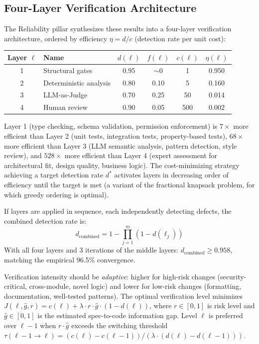 \documentclass[11pt, a4paper, logo, copyright]{googledeepmind}
\begin{document}
\subsection{Four-Layer Verification Architecture}

The Reliability pillar synthesizes these results into a four-layer verification architecture, ordered by efficiency $\eta = d/c$ (detection rate per unit cost):

\begin{center}
\small
\begin{tabular}{clcccc}
\toprule
Layer $\ell$ & Name & $d(\ell)$ & $f(\ell)$ & $c(\ell)$ & $\eta(\ell)$ \\
\midrule
1 & Structural gates & 0.95 & ${\sim}0$ & 1 & 0.950 \\
2 & Deterministic analysis & 0.80 & 0.10 & 5 & 0.160 \\
3 & LLM-as-Judge & 0.70 & 0.25 & 50 & 0.014 \\
4 & Human review & 0.90 & 0.05 & 500 & 0.002 \\
\bottomrule
\end{tabular}
\end{center}

Layer 1 (type checking, schema validation, permission enforcement) is $7\times$ more efficient than Layer 2 (unit tests, integration tests, property-based tests), $68\times$ more efficient than Layer 3 (LLM semantic analysis, pattern detection, style review), and $528\times$ more efficient than Layer 4 (expert assessment for architectural fit, design quality, business logic). The cost-minimizing strategy achieving a target detection rate $d^*$ activates layers in decreasing order of efficiency until the target is met (a variant of the fractional knapsack problem, for which greedy ordering is optimal).

If layers are applied in sequence, each independently detecting defects, the combined detection rate is:
\begin{equation}
    d_{\text{combined}} = 1 - \prod_{j=1}^{m} (1 - d(\ell_j))
\end{equation}
With all four layers and 3 iterations of the middle layers: $d_{\text{combined}} \geq 0.958$, matching the empirical 96.5\% convergence.

Verification intensity should be \emph{adaptive}: higher for high-risk changes (security-critical, cross-module, novel logic) and lower for low-risk changes (formatting, documentation, well-tested patterns). The optimal verification level minimizes $J(\ell, \hat{g}, r) = c(\ell) + \lambda \cdot r \cdot \hat{g} \cdot (1 - d(\ell))$, where $r \in [0,1]$ is risk level and $\hat{g} \in [0,1]$ is the estimated spec-to-code information gap. Level $\ell$ is preferred over $\ell - 1$ when $r \cdot \hat{g}$ exceeds the switching threshold $\tau(\ell{-}1 \to \ell) = (c(\ell) - c(\ell{-}1)) / (\lambda \cdot (d(\ell) - d(\ell{-}1)))$.
\end{document}
